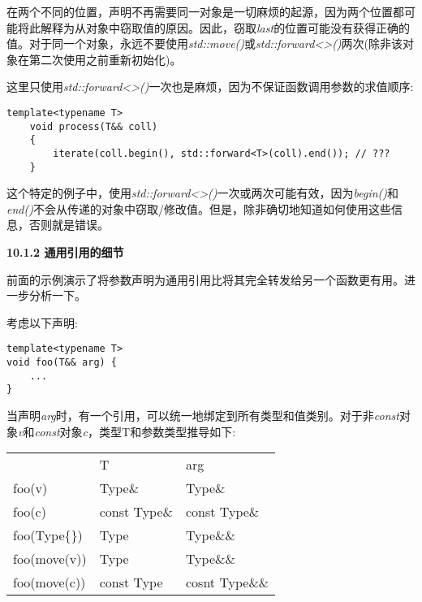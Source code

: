在两个不同的位置，声明不再需要同一对象是一切麻烦的起源，因为两个位置都可能将此解释为从对象中窃取值的原因。因此，窃取\textit{last}的位置可能没有获得正确的值。对于同一个对象，永远不要使用\textit{std::move()}或\textit{std::forward<>()}两次(除非该对象在第二次使用之前重新初始化)。\par

这里只使用\textit{std::forward<>()}一次也是麻烦，因为不保证函数调用参数的求值顺序:\par

\begin{lstlisting}[caption={}]
	template<typename T>
	void process(T&& coll)
	{
		iterate(coll.begin(), std::forward<T>(coll).end()); // ???
	}
\end{lstlisting}

这个特定的例子中，使用\textit{std::forward<>()}一次或两次可能有效，因为\textit{begin()}和\textit{end()}不会从传递的对象中窃取/修改值。但是，除非确切地知道如何使用这些信息，否则就是错误。\par

\hspace*{\fill} \par %
\textbf{10.1.2 通用引用的细节}

前面的示例演示了将参数声明为通用引用比将其完全转发给另一个函数更有用。进一步分析一下。\par

考虑以下声明:\par

\begin{lstlisting}[caption={}]
template<typename T>
void foo(T&& arg) {
	...
}
\end{lstlisting}

当声明\textit{arg}时，有一个引用，可以统一地绑定到所有类型和值类别。对于非\textit{const}对象\textit{v}和\textit{const}对象\textit{c}，类型T和参数类型推导如下:\par

\begin{table}[H]
	\begin{tabular}{lll}
		& T            & arg            \\
		foo(v)        & Type\&       & Type\&         \\
		foo(c)        & const Type\& & const Type\&   \\
		foo(Type\{\}) & Type         & Type\&\&       \\
		foo(move(v))  & Type         & Type\&\&       \\
		foo(move(c))  & const Type   & cosnt Type\&\&
	\end{tabular}
\end{table}


